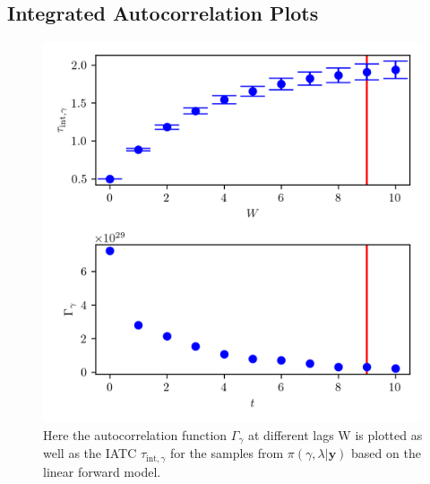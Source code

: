 \subsection{Integrated Autocorrelation Plots} 
\begin{figure}[ht!]
	\centering
	\includegraphics{UwerrTauIntFirstO3gam.png}
	\caption[IATC of $\gamma$ samples from $\pi(\gamma, \lambda| \bm{y})$, for linear model.]{Here the autocorrelation function $\Gamma_{\gamma}$ at different lags W is plotted as well as the IATC $\tau_{\text{int},\gamma}$ for the samples from $\pi(\gamma, \lambda| \bm{y})$ based on the linear forward model.}
	\label{fig:IATCGamLin}
\end{figure}
